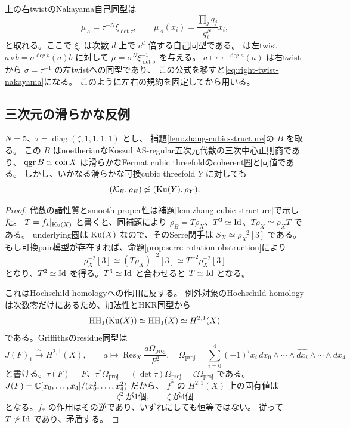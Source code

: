 \begin{remark}[右twistにおけるNakayamaの規約]
\label{rem:zhang-nakayama}
 上の右twistのNakayama自己同型は
 \begin{equation}\label{eq:right-twist-nakayama}
 \mu_A=\tau^{-N}\xi_{\det\tau},\qquad
 \mu_A(x_i)=\frac{\prod_jq_j}{q_i^N}x_i,
 \end{equation}
 と取れる。ここで \(\xi_c\) は次数 \(d\) 上で \(c^d\) 倍する自己同型である。
 \cite[Theorem 5.4]{RRZ}は左twist
 \(a\circ b=\sigma^{\deg b}(a)b\) に対して
 \(\mu=\sigma^N\xi_{\det\sigma}^{-1}\) を与える。
 \(a\mapsto\tau^{-\deg a}(a)\) は右twistから \(\sigma=\tau^{-1}\) の左twistへの同型であり、
 この公式を移すと\eqref{eq:right-twist-nakayama}になる。
 このように左右の規約を固定してから用いる。
\end{remark}

\subsection{三次元の滑らかな反例}

\begin{theorem}
\label{thm:zhang-threefold-counterexample}
 \(N=5\)、\(\tau=\operatorname{diag}(\zeta,1,1,1,1)\) とし、
 補題\ref{lem:zhang-cubic-structure}の \(B\) を取る。
 この \(B\) はnoetherianなKoszul AS-regular五次元代数の三次中心正則商であり、
 \(\operatorname{qgr} B\simeq\operatorname{coh}X\) は滑らかなFermat cubic threefoldのcoherent圏と同値である。
 しかし、いかなる滑らかな可換cubic threefold \(Y\) に対しても
 \[
 (\mathcal K_B,\rho_B)\not\simeq(\operatorname{Ku}(Y),\rho_Y).
 \]
\end{theorem}
\begin{proof}
 代数の諸性質とsmooth proper性は補題\ref{lem:zhang-cubic-structure}で示した。
 \(T=f_*|_{\operatorname{Ku}(X)}\) と書くと、同補題により
 \(\rho_B=T\rho_X\)、\(T^3\simeq\operatorname{Id}\)、\(T\rho_X\simeq\rho_XT\) である。
 underlying圏は \(\operatorname{Ku}(X)\) なので、そのSerre関手は
 \(S_X\simeq\rho_X^{-2}[3]\) である。
 もし可換pair模型が存在すれば、命題\ref{prop:serre-rotation-obstruction}により
 \[
 \rho_X^{-2}[3]\simeq (T\rho_X)^{-2}[3]
       \simeq T^{-2}\rho_X^{-2}[3]
 \]
 となり、\(T^2\simeq\operatorname{Id}\) を得る。\(T^3\simeq\operatorname{Id}\) と合わせると \(T\simeq\operatorname{Id}\) となる。

 これはHochschild homologyへの作用に反する。
 例外対象のHochschild homologyは次数零だけにあるため、加法性とHKR同型から
 \[
 \operatorname{HH}_1(\operatorname{Ku}(X))\simeq\operatorname{HH}_1(X)\simeq H^{2,1}(X)
 \]
 である。Griffithsのresidue同型\cite{Griffiths}は
 \[
 J(F)_1\xrightarrow{\sim}H^{2,1}(X),\qquad
 a\longmapsto\operatorname{Res}_X\frac{a\Omega_{\mathrm{proj}}}{F^2},
 \quad
 \Omega_{\mathrm{proj}}=
 \sum_{i=0}^4(-1)^i x_i\,dx_0\wedge\cdots\wedge\widehat{dx_i}\wedge\cdots\wedge dx_4
 \]
 と書ける。\(\tau(F)=F\)、\(\tau^*\Omega_{\mathrm{proj}}=(\det\tau)\Omega_{\mathrm{proj}}
 =\zeta\Omega_{\mathrm{proj}}\) である。
 \(J(F)=\mathbb C[x_0,\ldots,x_4]/(x_0^2,\ldots,x_4^2)\) だから、
 \(f^*\) の \(H^{2,1}(X)\) 上の固有値は
 \[
 \zeta^2\ \text{が1個},\qquad \zeta\ \text{が4個}
 \]
 となる。\(f_*\) の作用はその逆であり、いずれにしても恒等ではない。
 従って \(T\not\simeq\operatorname{Id}\) であり、矛盾する。
\end{proof}

